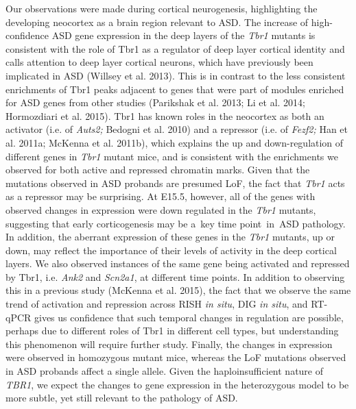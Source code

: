 \documentclass[]{article}
\begin{document}
Our observations were made during cortical neurogenesis, highlighting
the developing neocortex as a brain region relevant to ASD. The increase
of high-confidence ASD gene expression in the deep layers of the
\emph{Tbr1} mutants is consistent with the role of Tbr1 as a regulator
of deep layer cortical identity and calls attention to deep layer
cortical neurons, which have previously been implicated in ASD (Willsey
et al. 2013). This is in contrast to the less consistent enrichments of
Tbr1 peaks adjacent to genes that were part of modules enriched for ASD
genes from other studies (Parikshak et al. 2013; Li et al. 2014;
Hormozdiari et al. 2015). Tbr1 has known roles in the neocortex as both
an activator (i.e. of \emph{Auts2;} Bedogni et al. 2010) and a repressor
(i.e. of \emph{Fezf2;} Han et al. 2011a; McKenna et al. 2011b), which
explains the up and down-regulation of different genes in \emph{Tbr1}
mutant mice, and is consistent with the enrichments we observed for both
active and repressed chromatin marks. Given that the mutations observed
in ASD probands are presumed LoF, the fact that \emph{Tbr1} acts as a
repressor may be surprising. At E15.5, however, all of the genes with
observed changes in expression were down regulated in the \emph{Tbr1}
mutants, suggesting that early corticogenesis may be a~key time
point~in~ASD pathology. In addition, the aberrant expression of these
genes in the \emph{Tbr1} mutants, up or down, may reflect the importance
of their levels of activity in the deep cortical layers. We also
observed instances of the same gene being activated and repressed by
Tbr1, i.e. \emph{Ank2} and \emph{Scn2a1}, at different time points. In
addition to observing this in a previous study (McKenna et al. 2015),
the fact that we observe the same trend of activation and repression
across RISH \emph{in situ}, DIG \emph{in situ}, and RT-qPCR gives us
confidence that such temporal changes in regulation are possible,
perhaps due to different roles of Tbr1 in different cell types, but
understanding this phenomenon will require further study. Finally, the
changes in expression were observed in homozygous mutant mice, whereas
the LoF mutations observed in ASD probands affect a single allele. Given
the haploinsufficient nature of \emph{TBR1}, we expect the changes to
gene expression in the heterozygous model to be more subtle, yet still
relevant to the pathology of ASD.
\end{document}
